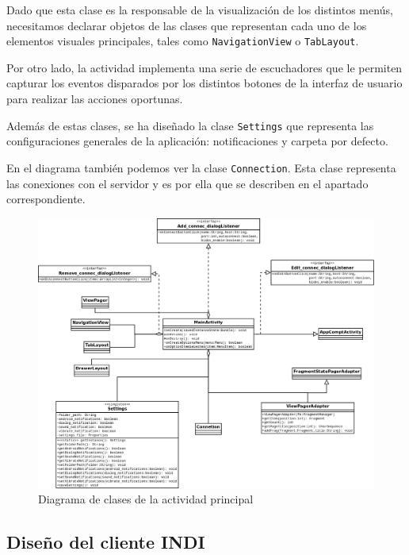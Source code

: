 \bigskip
Dado que esta clase es la responsable de la visualización de los distintos menús, necesitamos declarar objetos de las clases que representan cada uno de los elementos visuales principales, tales como \texttt{NavigationView}\cite{HTMMDND} o \texttt{TabLayout}\cite{ATLWSV}.

\bigskip
Por otro lado, la actividad implementa una serie de escuchadores que le permiten capturar los eventos disparados por los distintos botones de la interfaz de usuario para realizar las acciones oportunas.

\bigskip
Además de estas clases, se ha diseñado la clase \texttt{Settings} que representa las configuraciones generales de la aplicación: notificaciones y carpeta por defecto.

\bigskip
En el diagrama también podemos ver la clase \texttt{Connection}. Esta clase representa las conexiones con el servidor y es por ella que se describen en el apartado correspondiente.


\bigskip
\begin{figure}[!ht]
  \begin{center}
  \includegraphics[width=1\textwidth]{../images/main_activity.png}
  \caption{Diagrama de clases de la actividad principal}
  \label{fig:diag_main_activity}
  \end{center}
\end{figure}


\newpage
\subsection{Diseño del cliente INDI}

